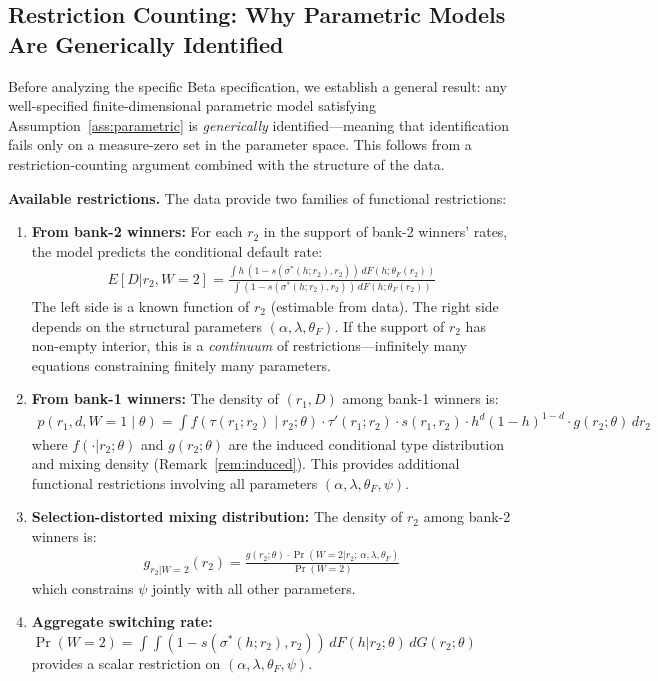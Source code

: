 \documentclass[12pt]{article}
\theoremstyle{plain}
\theoremstyle{plain}
\theoremstyle{definition}  %
\theoremstyle{remark}  %
\begin{document}
\subsection{Restriction Counting: Why Parametric Models Are Generically Identified}\label{sec:formal_id}

Before analyzing the specific Beta specification, we establish a general result: any well-specified finite-dimensional parametric model satisfying Assumption~\ref{ass:parametric} is \emph{generically} identified---meaning that identification fails only on a measure-zero set in the parameter space.  This follows from a restriction-counting argument combined with the structure of the data.

\medskip\noindent
\textbf{Available restrictions.}  The data provide two families of functional restrictions:

\begin{enumerate}
    \item \textbf{From bank-2 winners:} For each $r_2$ in the support of bank-2 winners' rates, the model predicts the conditional default rate:
    \begin{align}\label{eq:d2_restriction}
        E[D|r_2, W\!=\!2] = \frac{\int h\,(1 - s(\sigma^*(h; r_2), r_2))\, dF(h;\theta_F(r_2))}{\int (1 - s(\sigma^*(h; r_2), r_2))\, dF(h;\theta_F(r_2))}
    \end{align}
    The left side is a known function of $r_2$ (estimable from data).  The right side depends on the structural parameters $(\alpha, \lambda, \theta_F)$.  If the support of $r_2$ has non-empty interior, this is a \emph{continuum} of restrictions---infinitely many equations constraining finitely many parameters.
    
    \item \textbf{From bank-1 winners:} The density of $(r_1, D)$ among bank-1 winners is:
    \begin{align}\label{eq:b1_density}
        p(r_1, d, W\!=\!1 \mid \theta) = \int f(\tau(r_1;r_2) \mid r_2; \theta) \cdot \tau'(r_1;r_2) \cdot s(r_1, r_2) \cdot h^d(1\!-\!h)^{1-d} \cdot g(r_2;\theta)\, dr_2
    \end{align}
    where $f(\cdot|r_2;\theta)$ and $g(r_2;\theta)$ are the induced conditional type distribution and mixing density (Remark~\ref{rem:induced}).  This provides additional functional restrictions involving all parameters $(\alpha, \lambda, \theta_F, \psi)$.
    
    \item \textbf{Selection-distorted mixing distribution:} The density of $r_2$ among bank-2 winners is:
    \begin{align}\label{eq:g2_selection}
        g_{r_2|W=2}(r_2) = \frac{g(r_2;\theta) \cdot \Pr(W\!=\!2|r_2;\, \alpha,\lambda,\theta_F)}{\Pr(W\!=\!2)}
    \end{align}
    which constrains $\psi$ jointly with all other parameters.
    
    \item \textbf{Aggregate switching rate:} $\Pr(W\!=\!2) = \int\!\int (1-s(\sigma^*(h;r_2),r_2))\, dF(h|r_2;\theta)\, dG(r_2;\theta)$ provides a scalar restriction on $(\alpha,\lambda,\theta_F,\psi)$.
\end{enumerate}
\end{document}
